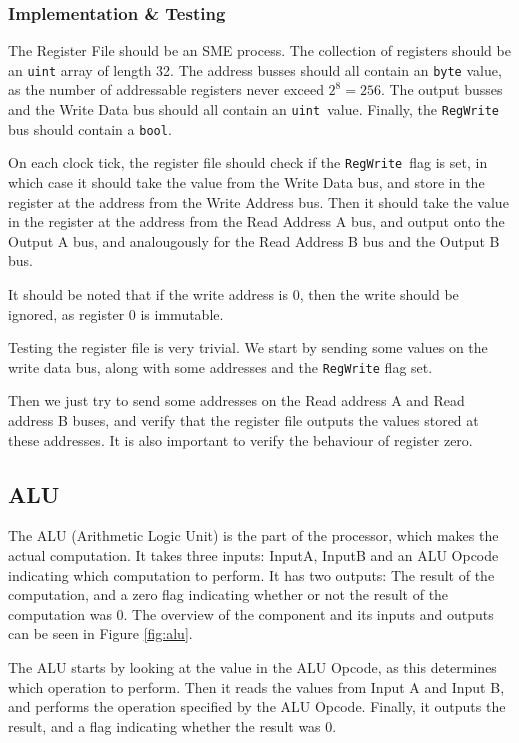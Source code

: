\subsubsection*{Implementation \& Testing}
The Register File should be an SME process. The collection of registers should
be an \texttt{uint} array of length 32. The address busses should all contain
an \texttt{byte} value, as the number of addressable registers never exceed
$2^8=256$. The output busses and the Write Data bus should all contain an
\texttt{uint} value. Finally, the \texttt{RegWrite} bus should contain a
\texttt{bool}.

On each clock tick, the register file should check if the
\texttt{RegWrite} flag is set, in which case it should take the value from the
Write Data bus, and store in the register at the address from the Write Address
bus. Then it should take the value in the register at the address from the Read
Address A bus, and output onto the Output A bus, and analougously for the Read
Address B bus and the Output B bus.

It should be noted that if the write address is 0, then the write should be
ignored, as register 0 is immutable.

Testing the register file is very trivial. We start by sending some values
on the write data bus, along with some addresses and the \texttt{RegWrite}
flag set.

Then we just try to send some addresses on the Read address A and Read
address B buses, and verify that the register file outputs the values
stored at these addresses. It is also important to verify the behaviour of
register zero.

\subsection{ALU}
The ALU (Arithmetic Logic Unit) is the part of the processor, which makes the
actual computation. It takes three inputs: InputA, InputB and an ALU Opcode
indicating which computation to perform. It has two outputs: The result of the
computation, and a zero flag indicating whether or not the result of the
computation was 0. The overview of the component and its inputs and outputs can
be seen in Figure \ref{fig:alu}.

The ALU starts by looking at the value in the ALU Opcode, as this determines
which operation to perform. Then it reads the values from Input A and Input B,
and performs the operation specified by the ALU Opcode. Finally, it outputs the
result, and a flag indicating whether the result was 0.

